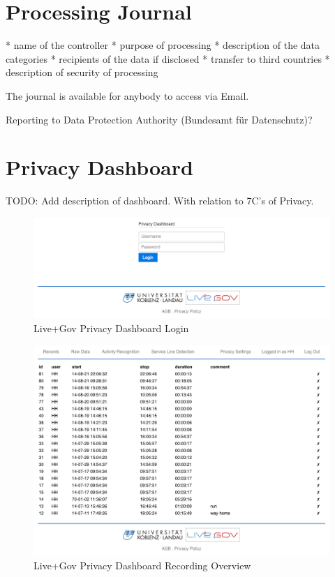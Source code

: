 \section{Processing Journal}
* name of the controller
* purpose of processing
* description of the data categories
* recipients of the data if disclosed
* transfer to third countries
* description of security of processing

The journal is available for anybody to access via Email.

Reporting to Data Protection Authority (Bundesamt für Datenschutz)?

\section{Privacy Dashboard}
TODO: Add description of dashboard. With relation to 7C's of Privacy.

\begin{figure}
\includegraphics[width=\textwidth]{screenshots/login.png}
\caption{Live+Gov Privacy Dashboard Login}
\end{figure}

\begin{figure}
\includegraphics[width=\textwidth]{screenshots/recordings.png}
\caption{Live+Gov Privacy Dashboard Recording Overview}
\end{figure}

